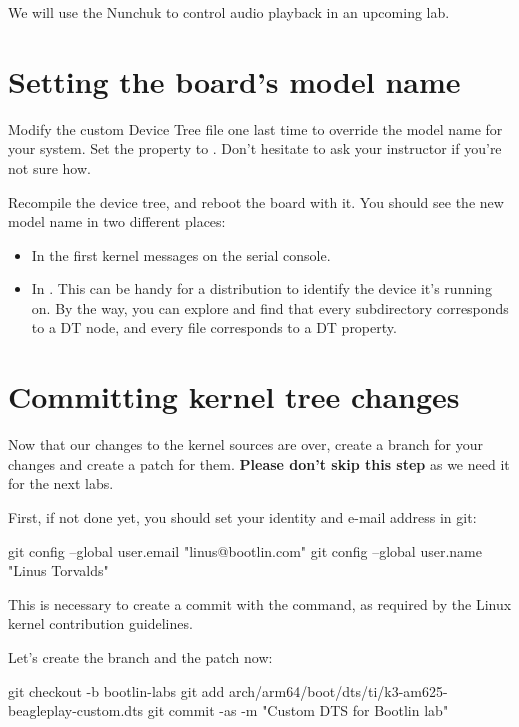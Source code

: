 We will use the Nunchuk to control audio playback in an upcoming lab.

\section{Setting the board's model name}

Modify the custom Device Tree file one last time to override the model
name for your system. Set the  property to
. Don't hesitate to ask your
instructor if you're not sure how.

Recompile the device tree, and reboot the board with it. You should see
the new model name in two different places:

\begin{itemize}
\item In the first kernel messages on the serial console.
\item In . This can be
      handy for a distribution to identify the device it's running on.
      By the way, you can explore  and
      find that every subdirectory corresponds to a DT node, and every
      file corresponds to a DT property.
\end{itemize}

\section{Committing kernel tree changes}

Now that our changes to the kernel sources are over,
create a branch for your changes and create a patch for them.
{\bf Please don't skip this step} as we need it for the next labs.

First, if not done yet, you should set your identity
and e-mail address in git:

\begin{bashinput}
git config --global user.email "linus@bootlin.com"
git config --global user.name "Linus Torvalds"
\end{bashinput}

This is necessary to create a commit with the 
command, as required by the Linux kernel contribution guidelines.

Let's create the branch and the patch now:

\begin{bashinput}
git checkout -b bootlin-labs
git add arch/arm64/boot/dts/ti/k3-am625-beagleplay-custom.dts
git commit -as -m "Custom DTS for Bootlin lab"
\end{bashinput}

